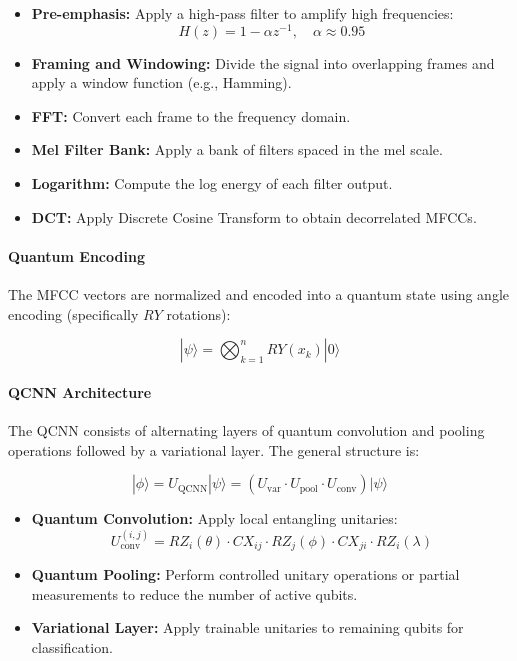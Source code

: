\documentclass[conference]{IEEEtran}
\begin{document}
\begin{itemize}
    \item \textbf{Pre-emphasis:} Apply a high-pass filter to amplify high frequencies:
          \[
              H(z) = 1 - \alpha z^{-1}, \quad \alpha \approx 0.95
          \]
    \item \textbf{Framing and Windowing:} Divide the signal into overlapping frames and apply a window function (e.g., Hamming).
    \item \textbf{FFT:} Convert each frame to the frequency domain.
    \item \textbf{Mel Filter Bank:} Apply a bank of filters spaced in the mel scale.
    \item \textbf{Logarithm:} Compute the log energy of each filter output.
    \item \textbf{DCT:} Apply Discrete Cosine Transform to obtain decorrelated MFCCs.
\end{itemize}

\paragraph{Quantum Encoding}

The MFCC vectors are normalized and encoded into a quantum state using angle encoding (specifically \( RY \) rotations):

\begin{equation}
    |\psi\rangle = \bigotimes_{k=1}^{n} RY(x_k) |0\rangle
\end{equation}

\paragraph{QCNN Architecture}

The QCNN consists of alternating layers of quantum convolution and pooling operations followed by a variational layer. The general structure is:

\begin{equation}
    |\phi\rangle = U_{\text{QCNN}} |\psi\rangle = (U_{\text{var}} \cdot U_{\text{pool}} \cdot U_{\text{conv}}) |\psi\rangle
\end{equation}

\begin{itemize}
    \item \textbf{Quantum Convolution:} Apply local entangling unitaries:
          \[
              U^{(i,j)}_{\text{conv}} = RZ_i(\theta) \cdot CX_{ij} \cdot RZ_j(\phi) \cdot CX_{ji} \cdot RZ_i(\lambda)
          \]
    \item \textbf{Quantum Pooling:} Perform controlled unitary operations or partial measurements to reduce the number of active qubits.
    \item \textbf{Variational Layer:} Apply trainable unitaries to remaining qubits for classification.
\end{itemize}
\end{document}
